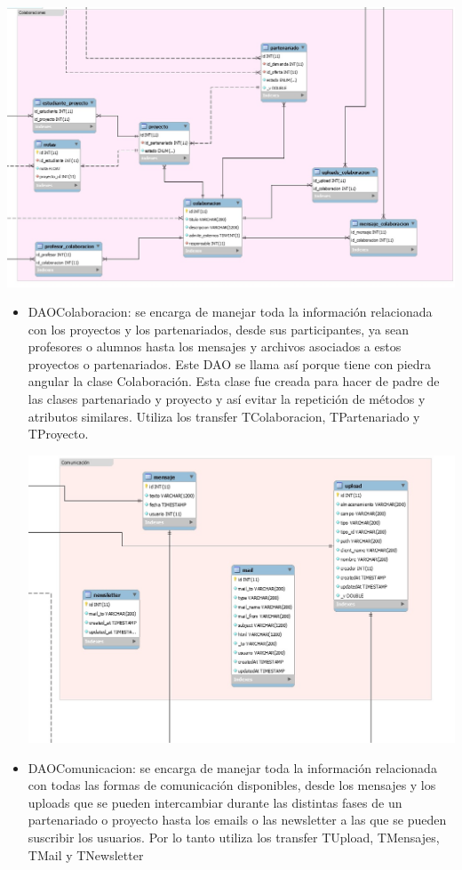 \documentclass[11pt]{article}
\begin{document}
\includegraphics[width=\textwidth]{colaboracion}
\begin{itemize}
	\item DAOColaboracion: se encarga de manejar toda la información relacionada con los proyectos y los partenariados, desde sus participantes, ya sean profesores o alumnos hasta los mensajes y archivos asociados a estos proyectos o partenariados. Este DAO se llama así porque tiene con piedra angular la clase Colaboración.
	Esta clase fue creada para hacer de padre de las clases partenariado y proyecto y así evitar la repetición de métodos y atributos similares. Utiliza los transfer TColaboracion, TPartenariado y TProyecto.

	\includegraphics[width=\textwidth]{comunicacion}
	\item DAOComunicacion: se encarga de manejar toda la información relacionada con todas las formas de comunicación disponibles, desde los mensajes y los uploads que se pueden intercambiar durante las distintas fases de un partenariado o proyecto hasta los emails o las newsletter a las que se pueden suscribir los 		usuarios. Por lo tanto utiliza los transfer TUpload, TMensajes, TMail y TNewsletter


\end{itemize}
\end{document}
